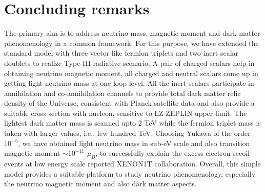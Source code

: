 \documentclass[aps, a4paper,superscriptaddress,12pt,preprintnumbers,floatfix,nofootinbib,amsmath,amssymb]{revtex4}
\begin{document}
\section{Concluding remarks}
%
The primary aim is to address neutrino mass, magnetic moment and dark matter phenomenology in a common framework. For this purpose, we have extended the standard model with three vector-like fermion triplets and two inert scalar doublets to realize Type-III radiative scenario.  A pair of charged scalars help in obtaining neutrino magnetic moment, all charged and neutral scalars come up in getting light neutrino mass at one-loop level. All the inert scalars participate in annihilation and co-annihilation channels to provide total dark matter relic density of the Universe, consistent with Planck satellite data and also provide a suitable cross section with nucleon, sensitive to LZ-ZEPLIN upper limit. The lightest dark matter mass is scanned upto $2$ TeV while the fermion triplet mass is taken with larger values, i.e., few hundred TeV. Choosing Yukawa of the order $10^{-5}$, we have obtained light neutrino mass in sub-eV scale and also transition magnetic moment  $\sim 10^{-11}$ $\mu_B$, to  successfully explain the excess electron recoil events at low energy scale reported XENON1T collaboration. Overall, this simple model provides a suitable platform to study neutrino phenomenology, especially the neutrino magnetic moment and also dark matter aspects.
\end{document}
